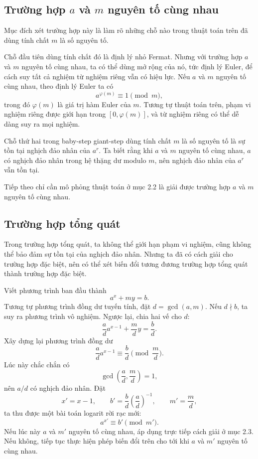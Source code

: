 \documentclass[11pt]{article}
\begin{document}
\subsection{Trường hợp \texorpdfstring{$a$}{a} và \texorpdfstring{$m$}{m}
nguyên tố cùng nhau}

Mục đích xét trường hợp này là làm rõ những chỗ nào trong thuật toán trên đã
dùng tính chất $m$ là số nguyên tố.

Chỗ đầu tiên dùng tính chất đó là định lý nhỏ Fermat. Nhưng với trường hợp
$a$ và $m$ nguyên tố cùng nhau, ta có thể dùng mở rộng của nó, tức định lý
Euler, để cách suy tất cả nghiệm từ nghiệm riêng vẫn có hiệu lực. Nếu $a$ và
$m$ nguyên tố cùng nhau, theo định lý Euler ta có
\[
  a^{\varphi(m)}\equiv 1\pmod m,
\]
trong đó $\varphi(m)$ là giá trị hàm Euler của $m$. Tương tự thuật toán trên,
phạm vi nghiệm riêng được giới hạn trong $[0,\varphi(m)]$, và từ nghiệm riêng
có thể dễ dàng suy ra mọi nghiệm.

Chỗ thứ hai trong baby-step giant-step dùng tính chất $m$ là số nguyên tố là
sự tồn tại nghịch đảo nhân của $a^r$. Ta biết rằng khi $a$ và $m$ nguyên tố
cùng nhau, $a$ có nghịch đảo nhân trong hệ thặng dư modulo $m$, nên nghịch đảo
nhân của $a^r$ vẫn tồn tại.

Tiếp theo chỉ cần mô phỏng thuật toán ở mục 2.2 là giải được trường hợp $a$ và
$m$ nguyên tố cùng nhau.

\subsection{Trường hợp tổng quát}

Trong trường hợp tổng quát, ta không thể giới hạn phạm vi nghiệm, cũng không
thể bảo đảm sự tồn tại của nghịch đảo nhân. Nhưng ta đã có cách giải cho
trường hợp đặc biệt, nên có thể xét biến đổi tương đương trường hợp tổng quát
thành trường hợp đặc biệt.

Viết phương trình ban đầu thành
\[
  a^x+my=b.
\]
Tương tự phương trình đồng dư tuyến tính, đặt $d=\gcd(a,m)$. Nếu $d\nmid b$,
ta suy ra phương trình vô nghiệm. Ngược lại, chia hai vế cho $d$:
\[
  \frac{a}{d}a^{x-1}+\frac{m}{d}y=\frac{b}{d}.
\]
Xây dựng lại phương trình đồng dư
\[
  \frac{a}{d}a^{x-1}\equiv \frac{b}{d}\pmod{\frac{m}{d}}.
\]
Lúc này chắc chắn có
\[
  \gcd\left(\frac{a}{d},\frac{m}{d}\right)=1,
\]
nên $a/d$ có nghịch đảo nhân. Đặt
\[
  x'=x-1,\qquad
  b'=\frac{b}{d}\left(\frac{a}{d}\right)^{-1},\qquad
  m'=\frac{m}{d},
\]
ta thu được một bài toán logarit rời rạc mới:
\[
  a^{x'}\equiv b'\pmod {m'}.
\]
Nếu lúc này $a$ và $m'$ nguyên tố cùng nhau, áp dụng trực tiếp cách giải ở mục
2.3. Nếu không, tiếp tục thực hiện phép biến đổi trên cho tới khi $a$ và $m'$
nguyên tố cùng nhau.
\end{document}

